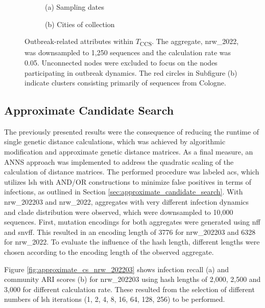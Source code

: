 \begin{figure}[H]
  \centering
  \begin{subfigure}[b]{0.47\textwidth}
    
    \caption*{(a) Sampling dates}
  \end{subfigure}
  \hfill
  \begin{subfigure}[b]{0.47\textwidth}
    
    \caption*{(b) Cities of collection}
  \end{subfigure}
  \caption[Outbreak-related attributes within $T$\textsubscript{CCS}]{Outbreak-related attributes within $T$\textsubscript{CCS}. The aggregate, nrw\_2022, was downsampled to 1,250 sequences and the calculation rate was 0.05. Unconnected nodes were excluded to focus on the nodes participating in outbreak dynamics. The red circles in Subfigure (b) indicate clusters consisting primarily of sequences from Cologne.}
  \label{fig:outbreak_related_attributes_accurate_cs}
\end{figure}

\subsection{Approximate Candidate Search}
\label{sec:approximate_candidate_search_results}
The previously presented results were the consequence of reducing the runtime of single genetic distance calculations, which was achieved by algorithmic modification and approximate genetic distance matrices. As a final measure, an ANNS approach was implemented to address the quadratic scaling of the calculation of distance matrices. The performed procedure was labeled \acrshort{acs}, which utilizes \acrshort{lsh} with AND/OR constructions to minimize false positives in terms of infections, as outlined in Section \ref{sec:approximate_candidate_search}. With nrw\_202203 and nrw\_2022, aggregates with very different infection dynamics and clade distribution were observed, which were downsampled to 10,000 sequences.
First, mutation encodings for both aggregates were generated using \acrshort{nff} and \acrshort{snvff}. This resulted in an encoding length of 3776 for nrw\_202203 and 6328 for nrw\_2022. To evaluate the influence of the hash length, different lengths were chosen according to the encoding length of the observed aggregate. 

Figure \ref{fig:approximate_cs_nrw_202203} shows infection recall (a) and community ARI scores (b) for nrw\_202203 using hash lengths of 2,000, 2,500 and 3,000 for different calculation rate. These resulted from the selection of different numbers of \acrshort{lsh} iterations (1, 2, 4, 8, 16, 64, 128, 256) to be performed. 

